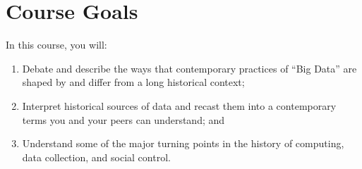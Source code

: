 \section{Course Goals}

In this course, you will:

\begin{enumerate}[1.]
\item
  Debate and describe the ways that contemporary practices of ``Big
  Data'' are shaped by and differ from a long historical context;
\item
  Interpret historical sources of data and recast them into a
  contemporary terms you and your peers can understand; and
\item
  Understand some of the major turning points in the history of
  computing, data collection, and social control.
\end{enumerate}
